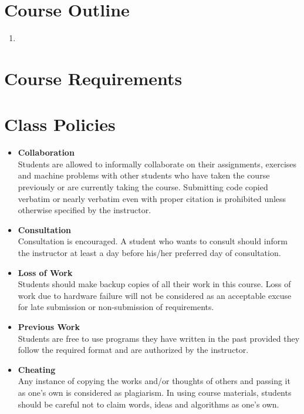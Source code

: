 \documentclass[9pt]{article}
\begin{document}
\section*{Course Outline}
\begin{enumerate}
	\item 
\end{enumerate}
\section*{Course Requirements}
\section*{Class Policies}
\begin{itemize}
	\item \textbf{Collaboration}\\
	Students are allowed to informally collaborate on their assignments, exercises and machine problems with other students who have taken the course previously or are currently taking the course. Submitting code copied verbatim or nearly verbatim even with proper citation is prohibited unless otherwise specified by the instructor.
	
	\item \textbf{Consultation}\\
	Consultation is encouraged. A student who wants to consult should inform the instructor at least a day before his/her preferred day of consultation.
	
	\item \textbf{Loss of Work}\\
	Students should make backup copies of all their work in this course. Loss of work due to hardware failure will not be considered as an acceptable excuse for late submission or non-submission of requirements.  
	
	\item \textbf{Previous Work}\\
	Students are free to use programs they have written in the past provided they follow the required format and are authorized by the instructor.
	
	\item \textbf{Cheating}\\
	Any instance of copying the works and/or thoughts of others and passing it as one's own is considered as plagiarism. In using course materials, students should be careful not to claim words, ideas and algorithms as one's own.
	
\end{itemize}
\end{document}
